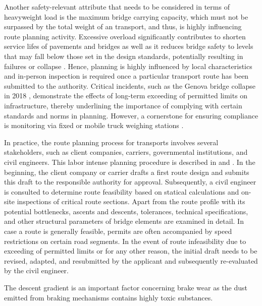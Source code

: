 Another safety-relevant attribute that needs to be considered in terms of heavyweight load is the maximum bridge carrying capacity, which must not be surpassed by the total weight of an \ohc transport, and thus, is highly influencing route planning activity.
Excessive overload significantly contributes to shorten service lifes of pavements and bridges as well as it reduces bridge safety to levels that may fall below those set in the design standards, potentially resulting in failures or collapse \cite{fiorillo2018fragility, yan2018optimal, ghosn2000development, wu2019assessment, lou2016effect}. Hence, planning is highly influenced by local characteristics and in-person inspection is required once a particular transport route has been submitted to the authority.
Critical incidents, such as the Genova bridge collapse in 2018 \cite{Morgese.2020, MorandiNYTimes},  demonstrate the effects of long-term exceeding of permitted limits on infrastructure, thereby underlining the importance of complying with certain standards and norms in \ohc planning. However, a cornerstone for ensuring compliance is monitoring via fixed or mobile truck weighing stations \cite{fiorillo2016minimizing}.
\par In practice, the route planning process for \ohc transports involves several stakeholders, such as client companies, carriers, governmental institutions, and civil engineers.
This labor intense planning procedure is described in \cite{Osegueda.1999} and \cite{ray2007web}. In the beginning, the client company or carrier drafts a first route design and submits this draft to the responsible authority for approval.
Subsequently, a civil engineer is consulted to determine route feasibility based on statical calculations and on-site inspections of critical route sections. Apart from the route profile with its potential bottlenecks, ascents and descents, tolerances, technical specifications, and other structural parameters of bridge elements are examined in detail. In case a route is generally feasible, permits are often accompanied by speed restrictions on certain road segments. In the event of route infeasibility due to exceeding of permitted limits or for any other reason, the initial draft needs to be revised, adapted, and resubmitted by the applicant and subsequently re-evaluated by the civil engineer.

{\color{red}
The descent gradient is an important factor concerning brake wear as the dust emitted from  braking mechanisms \cite{Gerlofs2019}  contains highly toxic substances.
}

